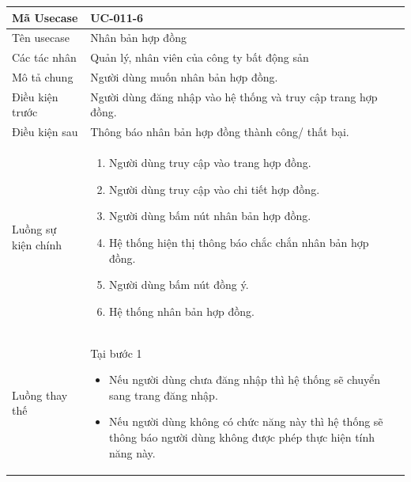 \documentclass[12pt,a4paper]{article}
\begin{document}
    \begin{table}[H]
        \centering
        \begin{tabular}{|p{3.5cm}|p{11.5cm}|c|}
            \hline
            Mã Usecase      & UC-011-6                                                      \\
            \hline
            Tên usecase     & Nhân bản hợp đồng                                             \\
            \hline
            Các tác nhân    & Quản lý, nhân viên của công ty bất động sản                   \\
            \hline
            Mô tả chung     & Người dùng muốn nhân bản hợp đồng.                            \\
            \hline

            Điều kiện trước & Người dùng đăng nhập vào hệ thống và truy cập trang hợp đồng. \\
            \hline

            Điều kiện sau   & Thông báo nhân bản hợp đồng thành công/ thất bại.             \\
            \hline

            Luồng sự kiện chính & \vspace{-.8cm}\begin{enumerate}
                                                    \item Người dùng truy cập vào trang hợp đồng.
                                                    \item Người dùng truy cập vào chi tiết hợp đồng.
                                                    \item  Người dùng bấm nút nhân bản hợp đồng.
                                                    \item  Hệ thống hiện thị thông báo chắc chắn nhân bản hợp đồng.
                                                    \item  Người dùng bấm nút đồng ý.
                                                    \item Hệ thống nhân bản hợp đồng.
            \end{enumerate}
            \\
            \hline
            Luồng thay thế & Tại bước 1\newline
            \vspace{-.8cm}\begin{itemize}
                              \item Nếu người dùng chưa đăng nhập thì hệ thống sẽ chuyển sang trang đăng nhập.
                              \item Nếu người dùng không có chức năng này thì hệ thống sẽ thông báo người dùng không được phép thực hiện tính năng này.
            \end{itemize}


\end{tabular}
\end{table}
\end{document}
